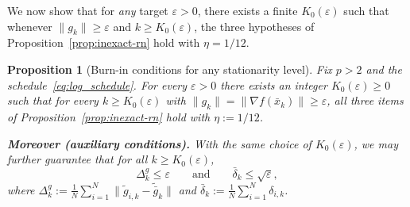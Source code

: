 \documentclass[11pt,a4paper]{article}
\newtheorem{proposition}[theorem]{Proposition}
\begin{document}
We now show that for \emph{any} target $\varepsilon>0$, there exists a finite
$K_0(\varepsilon)$ such that whenever $\|g_k\|\ge\varepsilon$ and $k\ge K_0(\varepsilon)$,
the three hypotheses of Proposition~\ref{prop:inexact-rn} hold with $\eta=1/12$.
\begin{proposition}[Burn-in conditions for any stationarity level]\label{prop:burnin}
Fix $p>2$ and the schedule~\eqref{eq:log_schedule}.
For every $\varepsilon>0$ there exists an integer $K_0(\varepsilon)\ge0$ such that
for every $k\ge K_0(\varepsilon)$ with $\|g_k\|=\|\nabla f(\bar x_k)\|\ge \varepsilon$,
all three items of Proposition~\ref{prop:inexact-rn} hold with $\eta:=1/12$.

\smallskip
\noindent\textbf{Moreover (auxiliary conditions).}
With the same choice of $K_0(\varepsilon)$, we may further guarantee that for all $k\ge K_0(\varepsilon)$,
\begin{equation}\label{eq:burnin_aux_enforce}
\Delta_k^g \le \varepsilon
\qquad\text{and}\qquad
\bar\delta_k \le \sqrt{\varepsilon},
\end{equation}
where $\Delta_k^g:=\frac1N\sum_{i=1}^N\|\tilde g_{i,k}-\tilde{\bar g}_k\|$ and $\bar\delta_k:=\frac1N\sum_{i=1}^N\delta_{i,k}$.
\end{proposition}
\end{document}
